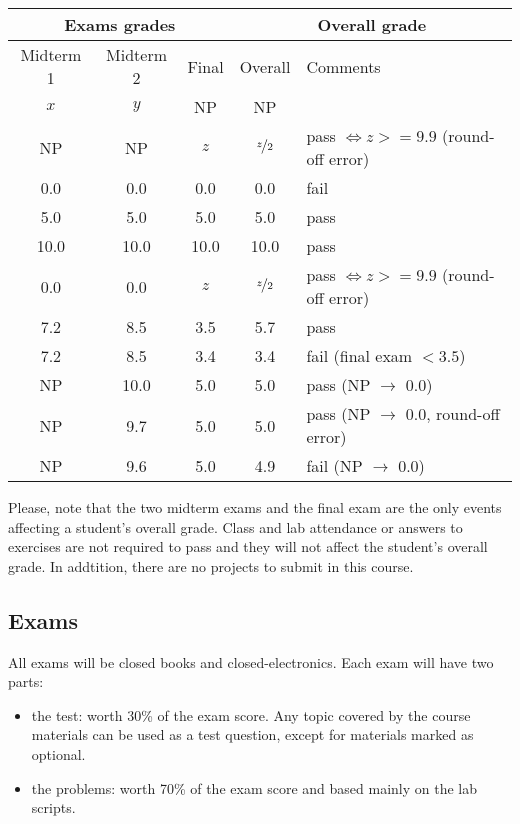 \documentclass[11pt, a4paper, twoside]{article}
\begin{document}
\begin{center}
  \begin{tabular}{|c|c|c||c|l|}
    \hline
    \multicolumn{3}{|c||}{Exams grades} & \multicolumn{2}{|c|}{Overall grade} \\
    \hline
    Midterm 1 & Midterm 2 & Final & Overall & Comments\\
    \hline
    $x$  & $y$  & NP   & NP   & \\
    NP   & NP   & $z$  & $\nicefrac{z}{2}$  & pass $\iff z >= 9.9$ (round-off error)\\
    \hline
    0.0  & 0.0  & 0.0  & 0.0  & fail \\
    5.0  & 5.0  & 5.0  & 5.0  & pass \\
    10.0 & 10.0 & 10.0 & 10.0 & pass \\
    \hline
    0.0  & 0.0  & $z$ & $\nicefrac{z}{2}$ & pass $\iff z >= 9.9$ (round-off error)\\
    \hline
    7.2  & 8.5  & 3.5  & 5.7  & pass \\
    7.2  & 8.5  & 3.4  & 3.4  & fail (final exam $< 3.5$) \\
    \hline
    NP   & 10.0 & 5.0  & 5.0  & pass (NP $\rightarrow$ 0.0) \\
    NP   & 9.7  & 5.0  & 5.0  & pass (NP $\rightarrow$ 0.0, round-off error) \\
    NP   & 9.6  & 5.0  & 4.9  & fail (NP $\rightarrow$ 0.0) \\
    \hline
  \end{tabular}
\end{center}

Please, note that the two midterm exams and the final exam are the only events
affecting a student's overall grade. Class and lab attendance or answers to
exercises are not required to pass and they will not affect the student's
overall grade.  In addtition, there are no projects to submit in this course.

\subsection{Exams}

All exams will be closed books and closed-electronics. Each exam will have two
parts:

\begin{itemize}

  \item the test: worth 30\% of the exam score. Any topic covered by the course
    materials can be used as a test question, except for materials marked as
    optional.

  \item the problems: worth 70\% of the exam score and based mainly on the lab
    scripts.

\end{itemize}
\end{document}
